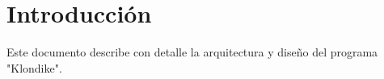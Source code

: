 \newpage
\section{Introducción}
Este documento describe con detalle la arquitectura y diseño del programa "Klondike".


\tableofcontents